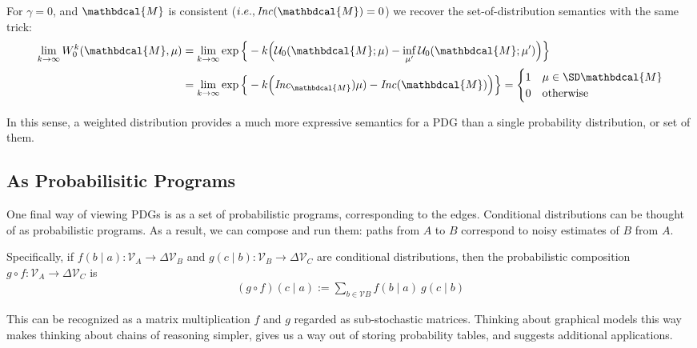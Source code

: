 \documentclass{article}
\theoremstyle{plain}
\theoremstyle{definition}
\theoremstyle{remark}
\newcommand{\note}[1]{{\color{blue}\ \!\Large\smash{\textbf{[}}{\normalsize\textsc{note:} #1}\ \!\smash{\textbf{]}}}}
\newcommand{\dg}[1]{\mathbdcal{#1}}
\newcommand\Inc{\mathit{Inc}}
\numberwithin{equation}{section}
\begin{document}
{For $\gamma = 0$, and $\dg M$ is consistent
($i.e., \Inc(\dg   M) = 0$)
 we recover the set-of-distribution semantics with
          the same trick: 
	\begin{align*}
		 \lim_{k \to \infty} W_0^k(\dg M, \mu)
		&= \lim_{k \to \infty} \exp\Big\{-k \Big(\mathcal U_0(\dg M;\mu) - \inf_{\mu'} \mathcal U_0(\dg M; \mu')\Big) \Big\} \\
		&= \lim_{k \to \infty} \exp\Big\{-k \Big(\Inc_{\dg
                 M})\mu) - \Inc(\dg M)\Big) \Big\}  
		= \begin{cases}
			1 & \mu \in \SD\dg M \\
			0 & \text{otherwise}
		\end{cases} 
	\end{align*}

	In this sense, a weighted distribution provides a much more expressive semantics for a PDG than a single probability distribution, or set of them.

	\begin{vleftovers}
	\subsection{As Probabilisitic Programs}\label{sec:prog-semantics}
	
	One final way of viewing PDGs is as a set of probabilistic programs, corresponding to the edges. 
	Conditional distributions can be thought of as probabilistic programs. As a result, we can compose and run them: paths from $A$ to $B$ correspond to noisy estimates of $B$ from $A$.
	
	Specifically, if $f(b \mid a) : \mathcal V_A \to \Delta \mathcal V_B$ and $g(c \mid b) : \mathcal V_B \to \Delta \mathcal V_C$ are conditional distributions, then the probabilistic composition $g\circ f : \mathcal V_A \to \Delta\mathcal V_C$ is
	\begin{align*}
		(g\circ  f) (c \mid a) :=  \sum_{b \in \mathcal V B}\!\! f (b \mid a)\ g(c \mid b)
	\end{align*}
	
	This can be recognized as a matrix multiplication $f$ and $g$ regarded as sub-stochastic matrices.
	Thinking about graphical models this way makes thinking about chains of reasoning simpler, gives us a way out of storing probability tables, and suggests additional applications.
	

\end{vleftovers}}
\end{document}
